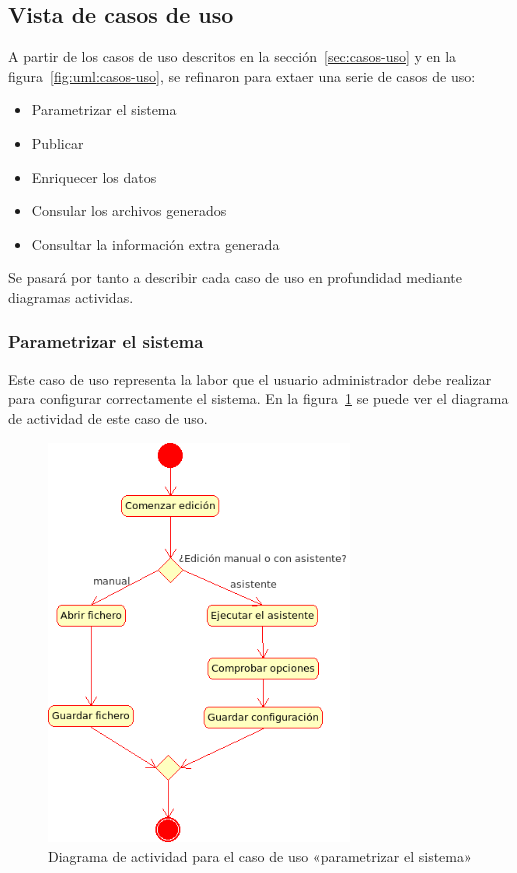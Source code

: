 
\subsection{Vista de casos de uso}

A partir de los casos de uso descritos en la sección~\ref{sec:casos-uso} y 
en la figura~\ref{fig:uml:casos-uso}, se refinaron para extaer una serie 
de casos de uso:

\begin{itemize}
 \item Parametrizar el sistema
 \item Publicar
 \item Enriquecer los datos
 \item Consular los archivos generados
 \item Consultar la información extra generada
\end{itemize}

Se pasará por tanto a describir cada caso de uso en profundidad mediante diagramas
actividas.

\subsubsection{Parametrizar el sistema}

Este caso de uso representa la labor que el usuario administrador debe realizar 
para configurar correctamente el sistema. En la figura~\ref{fig:uml:parametrizar-sistema}
se puede ver el diagrama de actividad de este caso de uso.

\begin{figure}[H]
 	\centering
	\includegraphics[width=8cm]{images/uml/casos-uso/parametrizar-sistema.png}
	\caption{Diagrama de actividad para el caso de uso «parametrizar el sistema»}
	\label{fig:uml:parametrizar-sistema}
\end{figure}

